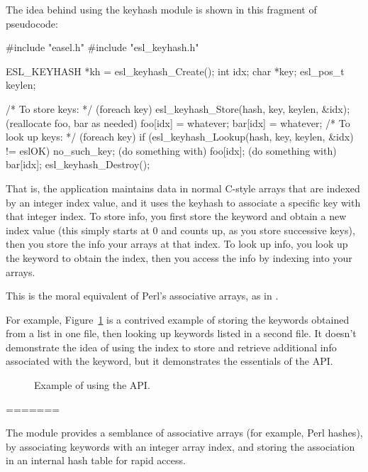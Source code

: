 The idea behind using the keyhash module is shown in this fragment of
pseudocode:

\begin{cchunk}
       #include "easel.h"
       #include "esl_keyhash.h"
     
       ESL_KEYHASH *kh = esl_keyhash_Create();
       int          idx;
       char        *key;
       esl_pos_t    keylen;
       
       /* To store keys: */
       (foreach key) {
          esl_keyhash_Store(hash, key, keylen, &idx);       
          (reallocate foo, bar as needed)
          foo[idx] = whatever;
          bar[idx] = whatever;
       }     
       /* To look up keys: */
       (foreach key) {
          if (esl_keyhash_Lookup(hash, key, keylen, &idx) != eslOK) { no_such_key; }
          (do something with) foo[idx];
          (do something with) bar[idx];
       }   
       esl_keyhash_Destroy();
\end{cchunk}

That is, the application maintains data in normal C-style arrays that
are indexed by an integer index value, and it uses the keyhash to
associate a specific key with that integer index. To store info, you
first store the keyword and obtain a new index value (this simply
starts at 0 and counts up, as you store successive keys), then you
store the info your arrays at that index. To look up info, you look up
the keyword to obtain the index, then you access the info by indexing
into your arrays.

This is the moral equivalent of Perl's associative arrays, as in
.

For example, Figure~\ref{fig:keyhash_example} is a contrived example
of storing the keywords obtained from a list in one file, then looking
up keywords listed in a second file. It doesn't demonstrate the idea
of using the index to store and retrieve additional info associated
with the keyword, but it demonstrates the essentials of the
 API.

\begin{figure}

\caption{Example of using the  API.}
\label{fig:keyhash_example}
\end{figure}

=======

The  module provides a semblance of associative arrays
(for example, Perl hashes), by associating keywords with an integer
array index, and storing the association in an internal hash table for
rapid access.

